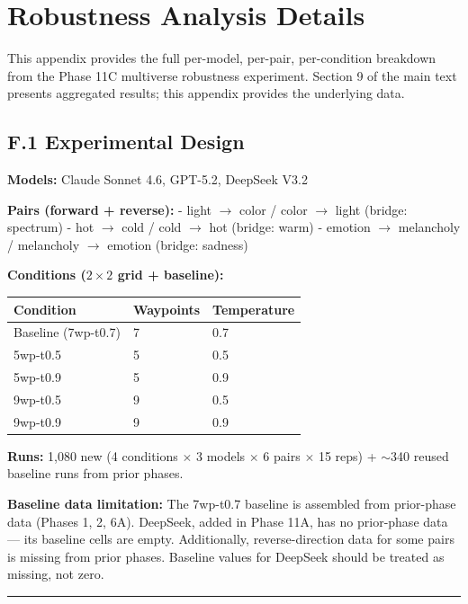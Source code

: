 \section{Robustness Analysis Details}\label{appendix-f-robustness-analysis-details}

This appendix provides the full per-model, per-pair, per-condition breakdown from the Phase 11C multiverse robustness experiment. Section 9 of the main text presents aggregated results; this appendix provides the underlying data.

\subsection{F.1 Experimental Design}\label{f.1-experimental-design}

\textbf{Models:} Claude Sonnet 4.6, GPT-5.2, DeepSeek V3.2

\textbf{Pairs (forward + reverse):} - light \(\to\) color / color \(\to\) light (bridge: spectrum) - hot \(\to\) cold / cold \(\to\) hot (bridge: warm) - emotion \(\to\) melancholy / melancholy \(\to\) emotion (bridge: sadness)

\textbf{Conditions ($2\times 2$ grid + baseline):}

\begin{longtable}[]{@{}lll@{}}
\toprule\noalign{}
Condition & Waypoints & Temperature \\
\midrule\noalign{}
\endhead
\bottomrule\noalign{}
\endlastfoot
Baseline (7wp-t0.7) & 7 & 0.7 \\
5wp-t0.5 & 5 & 0.5 \\
5wp-t0.9 & 5 & 0.9 \\
9wp-t0.5 & 9 & 0.5 \\
9wp-t0.9 & 9 & 0.9 \\
\end{longtable}

\textbf{Runs:} 1,080 new (4 conditions \(\times\) 3 models \(\times\) 6 pairs \(\times\) 15 reps) + ${\sim}$340 reused baseline runs from prior phases.

\textbf{Baseline data limitation:} The 7wp-t0.7 baseline is assembled from prior-phase data (Phases 1, 2, 6A). DeepSeek, added in Phase 11A, has no prior-phase data --- its baseline cells are empty. Additionally, reverse-direction data for some pairs is missing from prior phases. Baseline values for DeepSeek should be treated as missing, not zero.

\begin{center}\rule{0.5\linewidth}{0.5pt}\end{center}

